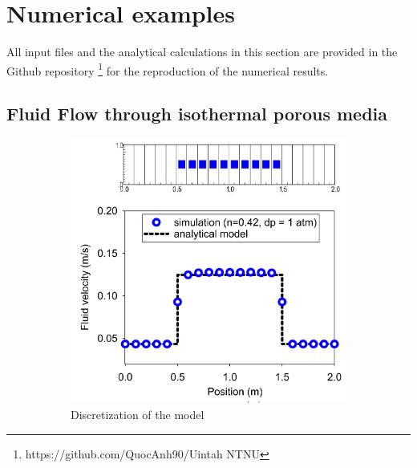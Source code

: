 \documentclass[preprint,12pt]{elsarticle}
\begin{document}
\section{\textsf{Numerical examples}}
All input files and the analytical calculations in this section are provided in the Github repository \footnote{https://github.com/QuocAnh90/Uintah NTNU} for the reproduction of the numerical results.\\
\subsection{\textsf{Fluid Flow through isothermal porous media}}
%
%
\begin{figure}[h]
\center
\begin{subfigure}[c]{0.5\linewidth}
\includegraphics[width=\linewidth]{porousflow1.jpg}
\caption{Discretization of the model}
\label{fig:3c}
\end{subfigure}\hfill    
\begin{subfigure}[d]{0.5\linewidth}

\end{subfigure}
\end{figure}
\end{document}
